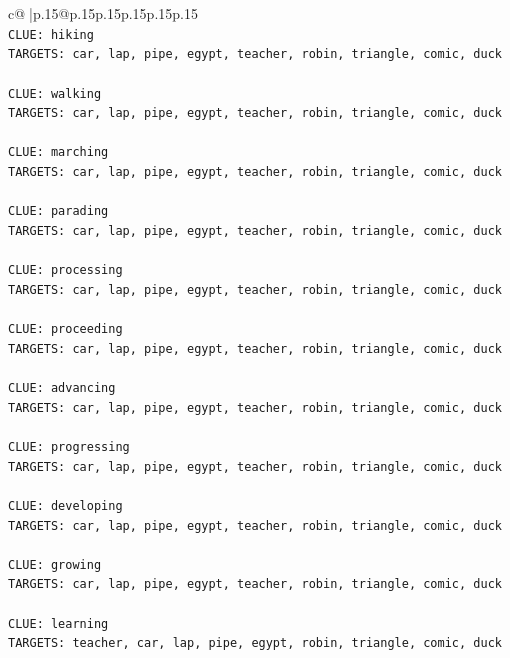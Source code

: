 \documentclass{article}
\begin{document}
{\begin{supertabular}{c@{$\;$}|p{.15\linewidth}@{}p{.15\linewidth}p{.15\linewidth}p{.15\linewidth}p{.15\linewidth}p{.15\linewidth}}
{{{\\ 
\texttt{CLUE: hiking} \\
\texttt{TARGETS: car, lap, pipe, egypt, teacher, robin, triangle, comic, duck} \\
\\ 
\texttt{CLUE: walking} \\
\texttt{TARGETS: car, lap, pipe, egypt, teacher, robin, triangle, comic, duck} \\
\\ 
\texttt{CLUE: marching} \\
\texttt{TARGETS: car, lap, pipe, egypt, teacher, robin, triangle, comic, duck} \\
\\ 
\texttt{CLUE: parading} \\
\texttt{TARGETS: car, lap, pipe, egypt, teacher, robin, triangle, comic, duck} \\
\\ 
\texttt{CLUE: processing} \\
\texttt{TARGETS: car, lap, pipe, egypt, teacher, robin, triangle, comic, duck} \\
\\ 
\texttt{CLUE: proceeding} \\
\texttt{TARGETS: car, lap, pipe, egypt, teacher, robin, triangle, comic, duck} \\
\\ 
\texttt{CLUE: advancing} \\
\texttt{TARGETS: car, lap, pipe, egypt, teacher, robin, triangle, comic, duck} \\
\\ 
\texttt{CLUE: progressing} \\
\texttt{TARGETS: car, lap, pipe, egypt, teacher, robin, triangle, comic, duck} \\
\\ 
\texttt{CLUE: developing} \\
\texttt{TARGETS: car, lap, pipe, egypt, teacher, robin, triangle, comic, duck} \\
\\ 
\texttt{CLUE: growing} \\
\texttt{TARGETS: car, lap, pipe, egypt, teacher, robin, triangle, comic, duck} \\
\\ 
\texttt{CLUE: learning} \\
\texttt{TARGETS: teacher, car, lap, pipe, egypt, robin, triangle, comic, duck} \\
\\ 
}}}
\end{supertabular}}
\end{document}
